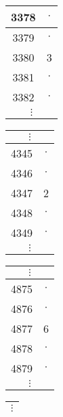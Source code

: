 \begin{frame}
{\begin{figure}[ht!]
\begin{adjustbox}{width = \textwidth}
\begin{tabular}{cc}
				\multicolumn{1}{|c|}{3378}		& \multicolumn{1}{c|}{$\cdot$} 		\\ 	\hline
				\multicolumn{1}{|c|}{3379}		& \multicolumn{1}{c|}{$\cdot$} 		\\ 	\hline
				\multicolumn{1}{|c|}{3380}		& \multicolumn{1}{c|}{3}       		\\ 	\hline
				\multicolumn{1}{|c|}{3381}		& \multicolumn{1}{c|}{$\cdot$} 		\\ 	\hline
				\multicolumn{1}{|c|}{3382}		& \multicolumn{1}{c|}{$\cdot$} 		\\ 	\hline
				\multicolumn{2}{c}{$\vdots$}                                  
			\end{tabular}
			\begin{tabular}{cc}
				\multicolumn{2}{c}{$\vdots$}                                   		\\ 	\hline
				\multicolumn{1}{|c|}{4345}		& \multicolumn{1}{c|}{$\cdot$} 		\\ 	\hline
				\multicolumn{1}{|c|}{4346}		& \multicolumn{1}{c|}{$\cdot$} 		\\ 	\hline
				\multicolumn{1}{|c|}{4347}		& \multicolumn{1}{c|}{2}       		\\ 	\hline
				\multicolumn{1}{|c|}{4348}		& \multicolumn{1}{c|}{$\cdot$} 		\\ 	\hline
				\multicolumn{1}{|c|}{4349}		& \multicolumn{1}{c|}{$\cdot$} 		\\ 	\hline
				\multicolumn{2}{c}{$\vdots$}                                  
			\end{tabular}
			\begin{tabular}{cc}
				\multicolumn{2}{c}{$\vdots$}                                   		\\ 	\hline
				\multicolumn{1}{|c|}{4875}		& \multicolumn{1}{c|}{$\cdot$} 		\\ 	\hline
				\multicolumn{1}{|c|}{4876}		& \multicolumn{1}{c|}{$\cdot$} 		\\ 	\hline
				\multicolumn{1}{|c|}{4877}		& \multicolumn{1}{c|}{6}       		\\ 	\hline
				\multicolumn{1}{|c|}{4878}		& \multicolumn{1}{c|}{$\cdot$} 		\\ 	\hline
				\multicolumn{1}{|c|}{4879}		& \multicolumn{1}{c|}{$\cdot$} 		\\ 	\hline
				\multicolumn{2}{c}{$\vdots$}                                  
			\end{tabular}
			\begin{tabular}{cc}
				\multicolumn{2}{c}{$\vdots$}                                   		\\ 	\hline

\end{tabular}
\end{adjustbox}
\end{figure}}
\end{frame}
